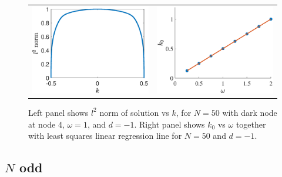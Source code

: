 \documentclass[12pt]{article}
\begin{document}
\begin{figure}[H]
\begin{center}
\begin{tabular}{cc}
\includegraphics[width=8cm]{evenbif50.eps} &
\includegraphics[width=8cm]{k0vsomega.eps}
\end{tabular}
\end{center}
\caption{Left panel shows $l^2$ norm of solution vs $k$, for $N = 50$ with dark node at node 4, $\omega = 1$, and $d=-1$. Right panel shows $k_0$ vs $\omega$ together with least squares linear regression line for $N = 50$ and $d = -1$.}
\label{fig:evenbif}
\end{figure}

\subsection{\texorpdfstring{$N$}{N} odd}
\end{document}
